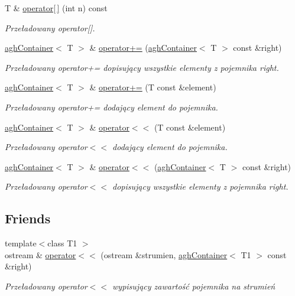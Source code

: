 \begin{DoxyCompactItemize}
\-T \& \hyperlink{classaghContainer_a04ab7432d2fa15a40099510f9450ae53}{operator\mbox{[}$\,$\mbox{]}} (int n) const 
\begin{DoxyCompactList}\small\item\em \-Przeładowany operator\mbox{[}\mbox{]}. \end{DoxyCompactList}\item 
\hyperlink{classaghContainer}{agh\-Container}$<$ \-T $>$ \& \hyperlink{classaghContainer_ae957f2aa0098275910ecdcc953d2da6b}{operator+=} (\hyperlink{classaghContainer}{agh\-Container}$<$ \-T $>$ const \&right)
\begin{DoxyCompactList}\small\item\em \-Przeładowany operator+= dopisujący wszystkie elementy z pojemnika right. \end{DoxyCompactList}\item 
\hyperlink{classaghContainer}{agh\-Container}$<$ \-T $>$ \& \hyperlink{classaghContainer_ab3848b1c821bfdd053632f5ce393ba0f}{operator+=} (\-T const \&element)
\begin{DoxyCompactList}\small\item\em \-Przeładowany operator+= dodający element do pojemnika. \end{DoxyCompactList}\item 
\hyperlink{classaghContainer}{agh\-Container}$<$ \-T $>$ \& \hyperlink{classaghContainer_acbe6f92b51bf58a6cf73ff611c0fc3fb}{operator$<$$<$} (\-T const \&element)
\begin{DoxyCompactList}\small\item\em \-Przeładowany operator$<$$<$ dodający element do pojemnika. \end{DoxyCompactList}\item 
\hyperlink{classaghContainer}{agh\-Container}$<$ \-T $>$ \& \hyperlink{classaghContainer_a11a42ae2313402de6847aa32b2f96777}{operator$<$$<$} (\hyperlink{classaghContainer}{agh\-Container}$<$ \-T $>$ const \&right)
\begin{DoxyCompactList}\small\item\em \-Przeładowany operator$<$$<$ dopisujący wszystkie elementy z pojemnika right. \end{DoxyCompactList}\end{DoxyCompactItemize}
\subsection*{\-Friends}
\begin{DoxyCompactItemize}
\item 
{\footnotesize template$<$class T1 $>$ }\\ostream \& \hyperlink{classaghContainer_a63ee03bdbf0abca1b53ef3814af9ab16}{operator$<$$<$} (ostream \&strumien, \hyperlink{classaghContainer}{agh\-Container}$<$ \-T1 $>$ const \&right)
\begin{DoxyCompactList}\small\item\em \-Przeładowany operator$<$$<$ wypisujący zawartość pojemnika na strumień \end{DoxyCompactList}\end{DoxyCompactItemize}


